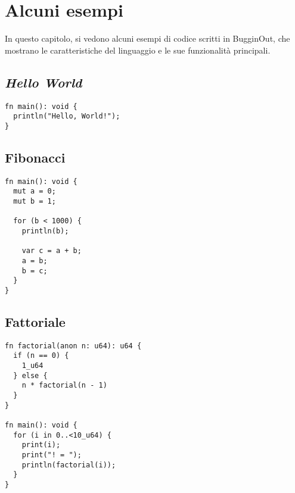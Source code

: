 
\chapter{Alcuni esempi}
\label{chap:alcuni-esempi}

In questo capitolo, si vedono alcuni esempi di codice scritti in BugginOut, che mostrano le caratteristiche del linguaggio e le sue funzionalità principali.


\section*{\textit{Hello World}}

\hfill

\begin{mdframed}[style=examplestyle]
	\begin{verbatim}
fn main(): void {
  println("Hello, World!");
}
	\end{verbatim}
\end{mdframed}

\section*{Fibonacci}

\hfill

\begin{mdframed}[style=examplestyle]
	\begin{verbatim}
fn main(): void {
  mut a = 0;
  mut b = 1;

  for (b < 1000) {
    println(b);

    var c = a + b;
    a = b;
    b = c;
  }
}
	\end{verbatim}
\end{mdframed}

\section*{Fattoriale}

\hfill

\begin{mdframed}[style=examplestyle]
	\begin{verbatim}
fn factorial(anon n: u64): u64 {
  if (n == 0) {
    1_u64
  } else {
    n * factorial(n - 1)
  }
}

fn main(): void {
  for (i in 0..<10_u64) {
    print(i);
    print("! = ");
    println(factorial(i));
  }
}
	\end{verbatim}
\end{mdframed}

